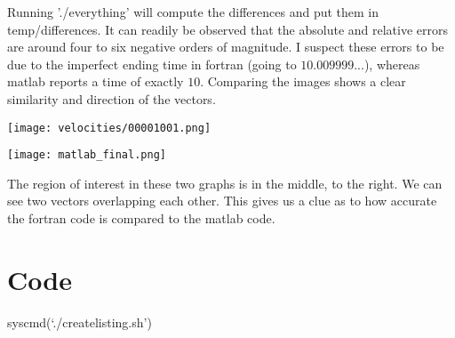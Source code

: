 \documentclass[listof=totoc]{report}
\begin{document}
Running './everything' will compute the differences and put them in temp/differences. It can readily be observed that the absolute and relative errors are around four to six negative orders of magnitude. I suspect these errors to be due to the imperfect ending time in fortran (going to $10.009999$...), whereas matlab reports a time of exactly $10$. Comparing the images shows a clear similarity and direction of the vectors.

\begin{center}
\texttt{[image: velocities/00001001.png]}
\end{center}
\begin{center}
\texttt{[image: matlab\_final.png]}
\end{center}

The region of interest in these two graphs is in the middle, to the right. We can see two vectors overlapping each other. This gives us a clue as to how accurate the fortran code is compared to the matlab code.

\chapter{Code}
syscmd(`./createlisting.sh')
\end{document}
